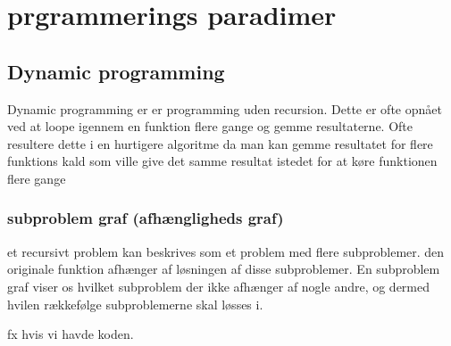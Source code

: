 \documentclass[letterpaper,10pt,danish]{sphinxmanual}
\begin{document}
\sphinxstepscope


\section{prgrammerings paradimer}
\label{\detokenize{Algorithmer/Dynamic:prgrammerings-paradimer}}\label{\detokenize{Algorithmer/Dynamic::doc}}

\subsection{Dynamic programming}
\label{\detokenize{Algorithmer/Dynamic:dynamic-programming}}
\sphinxAtStartPar
Dynamic programming er er programming uden recursion. Dette er ofte opnået ved at loope igennem en funktion flere gange og gemme resultaterne. Ofte resultere dette i en hurtigere algoritme da man kan gemme resultatet for flere funktions kald som ville give det samme resultat istedet for at køre funktionen flere gange


\subsubsection{subproblem graf (afhængligheds graf)}
\label{\detokenize{Algorithmer/Dynamic:subproblem-graf-afhaengligheds-graf}}
\sphinxAtStartPar
et recursivt problem kan beskrives som et problem med flere subproblemer. den originale funktion afhænger af løsningen af disse subproblemer. En subproblem graf viser os hvilket subproblem der ikke afhænger af nogle andre, og dermed hvilen rækkefølge subproblemerne skal løsses i.

\sphinxAtStartPar
fx hvis vi havde koden.

\begin{sphinxVerbatim}[commandchars=\\\{\}]
   
       
         
       
         
     
\end{sphinxVerbatim}
\end{document}
